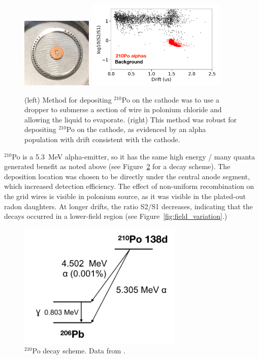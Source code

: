 \begin{figure}[htbp]
\begin{center}
\includegraphics[width=0.3\textwidth]{figures/etrains/po_on_wires.png}
\includegraphics[width=0.6\textwidth]{figures/etrains/po_drift.png}
\caption{(left) Method for depositing $^{210}$Po on the cathode was to use a dropper to submerse a section of wire in polonium chloride and allowing the liquid to evaporate. (right) This method was robust for depositing $^{210}$Po on the cathode, as evidenced by an alpha population with drift consistent with the cathode. }
\label{fig:polonium}
\end{center}
\end{figure}


$^{210}$Po is a 5.3~MeV alpha-emitter, so it has the same high energy / many quanta generated benefit as noted above (see Figure~\ref{fig:po_decay} for a decay scheme). The deposition location was chosen to be directly under the central anode segment, which increased detection efficiency. The effect of non-uniform recombination on the grid wires is visible in polonium source, as it was visible in the plated-out radon daughters. At longer drifts, the ratio S2/S1 decreases, indicating that the decays occurred in a lower-field region (see Figure~\ref{fig:field_variation}.)

\begin{figure}[htbp]
\begin{center}
\includegraphics[width=0.7\textwidth]{figures/etrains/po_decay.png}
\caption{$^{210}$Po decay scheme. Data from \cite{LNHB}.}
\label{fig:po_decay}
\end{center}
\end{figure}

